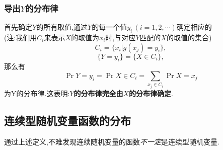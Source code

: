 \subsubsection{导出$Y$的分布律}
首先确定$Y$的所有取值,通过$Y$的每一个值$y_i\,(i=1,2,\cdots)$确定相应的\\
(注:我们用$C_i$来表示$X$的取值为$x_i$时,与对应$Y$匹配的$X$的取值的集合)
\begin{equation*}
    C_i=\{x_i | g(x_j) = y_i\},
\end{equation*}
\begin{equation*}
    \{Y=y_i\}=\{X\in C_i\},
\end{equation*}
那么有\\
\begin{equation}
    \Pr{Y=y_i} = \Pr{X\in C_i } = \sum_{x_j \in C_i }\Pr{X=x_j} \label{eq:2.14}
\end{equation}
为Y的分布律.这表明:\textbf{$Y$的分布律完全由$X$的分布律确定}.
\subsection{连续型随机变量函数的分布}
通过上述定义,不难发现连续随机变量的函数\textit{不一定}是连续型随机变量.
